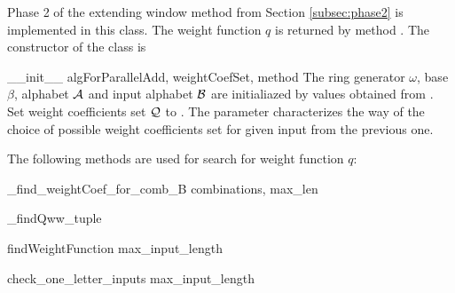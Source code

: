 Phase 2 of the extending window method from Section \ref{subsec:phase2} is implemented in this class. The weight function $q$ is returned by method . The constructor of the class is

\begin{method}{\_\_init\_\_}{ algForParallelAdd, weightCoefSet, method}
The ring generator $\omega$, base $\beta$, alphabet $\mathcal{A}$ and input alphabet $\mathcal{B}$ are initialiazed by values obtained from . Set weight coefficients set $\mathcal{Q}$ to . The parameter  characterizes the way of the choice of possible weight coefficients set for given input from the previous one.
\end{method}

The following methods are used for search for weight function $q$:

\begin{method}{\_find\_weightCoef\_for\_comb\_B}{ combinations, max\_len}

\end{method}


\begin{method}{\_findQw}{w\_tuple}

\end{method}


\begin{method}{findWeightFunction}{ max\_input\_length}

\end{method}


\begin{method}{check\_one\_letter\_inputs}{ max\_input\_length}

\end{method}
